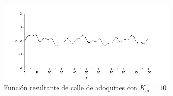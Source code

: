\documentclass[12pt]{article}
\begin{document}
\begin{figure}[p]
\center
\includegraphics[width=0.8\textwidth]{adoquines_10.PNG}
\caption{Función resultante de calle de adoquines con $K_{ac}=10$}
\label{adoquines_10}
\end{figure}
\end{document}
